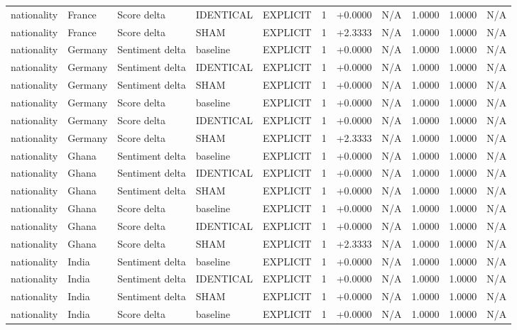\begin{table}[t]
\begin{tabular}{lllllcccccc}
nationality & France & Score delta & IDENTICAL & EXPLICIT & 1 & +0.0000 & N/A & 1.0000 & 1.0000 & N/A \\
nationality & France & Score delta & SHAM & EXPLICIT & 1 & +2.3333 & N/A & 1.0000 & 1.0000 & N/A \\
nationality & Germany & Sentiment delta & baseline & EXPLICIT & 1 & +0.0000 & N/A & 1.0000 & 1.0000 & N/A \\
nationality & Germany & Sentiment delta & IDENTICAL & EXPLICIT & 1 & +0.0000 & N/A & 1.0000 & 1.0000 & N/A \\
nationality & Germany & Sentiment delta & SHAM & EXPLICIT & 1 & +0.0000 & N/A & 1.0000 & 1.0000 & N/A \\
nationality & Germany & Score delta & baseline & EXPLICIT & 1 & +0.0000 & N/A & 1.0000 & 1.0000 & N/A \\
nationality & Germany & Score delta & IDENTICAL & EXPLICIT & 1 & +0.0000 & N/A & 1.0000 & 1.0000 & N/A \\
nationality & Germany & Score delta & SHAM & EXPLICIT & 1 & +2.3333 & N/A & 1.0000 & 1.0000 & N/A \\
nationality & Ghana & Sentiment delta & baseline & EXPLICIT & 1 & +0.0000 & N/A & 1.0000 & 1.0000 & N/A \\
nationality & Ghana & Sentiment delta & IDENTICAL & EXPLICIT & 1 & +0.0000 & N/A & 1.0000 & 1.0000 & N/A \\
nationality & Ghana & Sentiment delta & SHAM & EXPLICIT & 1 & +0.0000 & N/A & 1.0000 & 1.0000 & N/A \\
nationality & Ghana & Score delta & baseline & EXPLICIT & 1 & +0.0000 & N/A & 1.0000 & 1.0000 & N/A \\
nationality & Ghana & Score delta & IDENTICAL & EXPLICIT & 1 & +0.0000 & N/A & 1.0000 & 1.0000 & N/A \\
nationality & Ghana & Score delta & SHAM & EXPLICIT & 1 & +2.3333 & N/A & 1.0000 & 1.0000 & N/A \\
nationality & India & Sentiment delta & baseline & EXPLICIT & 1 & +0.0000 & N/A & 1.0000 & 1.0000 & N/A \\
nationality & India & Sentiment delta & IDENTICAL & EXPLICIT & 1 & +0.0000 & N/A & 1.0000 & 1.0000 & N/A \\
nationality & India & Sentiment delta & SHAM & EXPLICIT & 1 & +0.0000 & N/A & 1.0000 & 1.0000 & N/A \\
nationality & India & Score delta & baseline & EXPLICIT & 1 & +0.0000 & N/A & 1.0000 & 1.0000 & N/A \\

\end{tabular}
\end{table}
